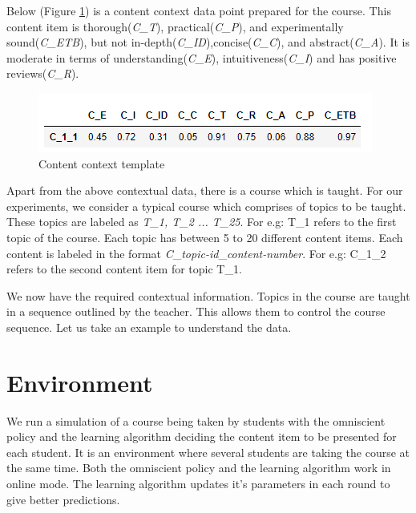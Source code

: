 
Below (Figure \ref{chap5:cc_template}) is a content context data point prepared for the course. This content item is thorough(\textit{C\_T}), practical(\textit{C\_P}), and experimentally sound(\textit{C\_ETB}), but not in-depth(\textit{C\_ID}),concise(\textit{C\_C}), and abstract(\textit{C\_A}). It is moderate in terms of  understanding(\textit{C\_E}), intuitiveness(\textit{C\_I}) and has positive reviews(\textit{C\_R}). \par

\begin{figure}[H]
    \centering
    \includegraphics[scale=1.0]{Figures/content_context.PNG}
    \caption{Content context template}
    \label{chap5:cc_template}
\end{figure}

Apart from the above contextual data, there is a course which is taught. For our experiments, we consider a typical course which comprises of topics to be taught. These topics are labeled as \textit{ T\_1, T\_2 ... T\_25}. For e.g: T\_1 refers to the first topic of the course. Each topic has between 5 to 20 different content items. Each content is labeled in the format \textit{C}\_\textit{topic-id}\_\textit{content-number}. For e.g: C\_1\_2 refers to the second content item for topic T\_1. \par

We now have the required contextual information. Topics in the course are taught in a sequence outlined by the teacher. This allows them to control the course sequence. Let us take an example to understand the data.\par

\section{Environment \label{chap5:environment}}

We run a simulation of a course being taken by students with the omniscient policy and the learning algorithm deciding the content item to be presented for each student. It is an environment where several students are taking the course at the same time. Both the omniscient policy and the learning algorithm work in online mode. The learning algorithm updates it's parameters in each round to give better predictions. \par

